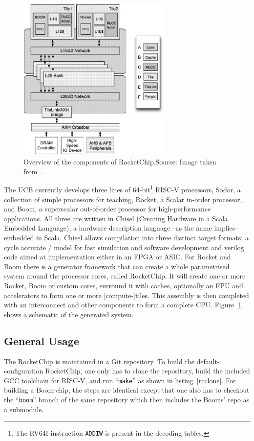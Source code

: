 \documentclass[journal,a4paper]{IEEEtran}
\newcommand{\source}[1]{Source: #1}
\begin{document}
\begin{figure}[!t]
	\centering
	\includegraphics[width=3in]{rcov}
	\caption{Overview of the components of RocketChip.\newline\hspace{\linewidth}\source{Image taken from~\cite{rocket}}.}
	\label{rcov}
\end{figure}
The UCB currently develops three lines of 64-bit\footnote{The RV64I instruction \texttt{ADDIW}\cite[p.28]{riscv} is present in the decoding tables\cite{code-tables}.}  RISC-V processors, Sodor\cite{sodor}, a collection of simple processors for teaching, Rocket\cite[p.4]{rocket}, a Scalar in-order processor, and Boom\cite{boom}, a superscalar out-of-order processor for high-performance applications.
All three are written in Chisel (Creating Hardware in a Scala Embedded Language), a hardware description language --as the name implies-- embedded in Scala.
Chisel allows compilation into three distinct target formats: a cycle accurate \CC/ model for fast simulation and software development and verilog code aimed at implementation either in an FPGA or ASIC\@.
For Rocket and Boom there is a generator framework that can create a whole parametrised system around the processor cores, called RocketChip\cite{rocket}.
It will create one or more Rocket, Boom or custom cores, surround it with caches, optionally an FPU and accelerators to form one or more [compute-]tiles.
This assembly is then completed with an interconnect and other components to form a complete CPU.
Figure~\ref{rcov} shows a schematic of the generated system.


\subsection{General Usage}
The RocketChip is maintained in a Git repository\cite{rc-github}.
To build the default-configuration RocketChip, one only has to clone the repository, build the included GCC toolchain for RISC-V, and run ``\texttt{make}'' as shown in listing~\ref{rcclone}. For building a Boom-chip, the steps are identical except that one also has to checkout the ``\texttt{boom}'' branch of the same repository which then includes the Booms' repo\cite{boom-github} as a submodule.
\end{document}

